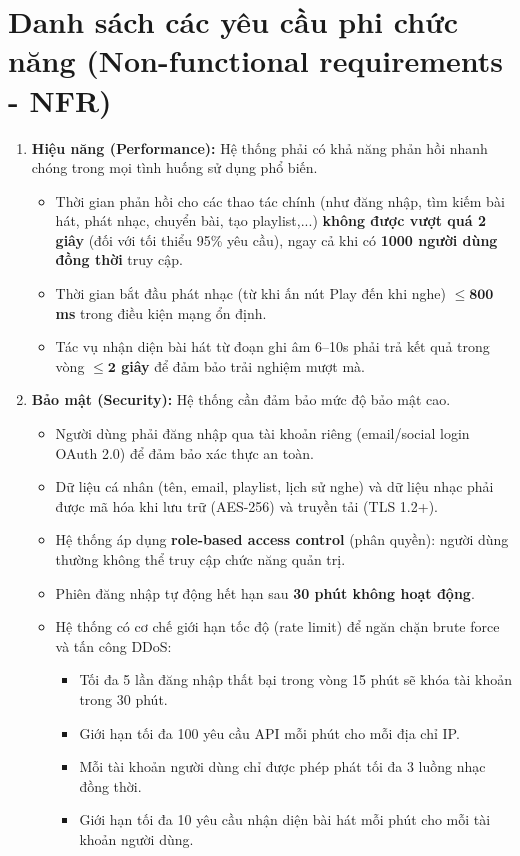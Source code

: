 \section{Danh sách các yêu cầu phi chức năng (Non-functional requirements - NFR)}
\begin{enumerate}
    \item \textbf{Hiệu năng (Performance):} Hệ thống phải có khả năng phản hồi nhanh chóng trong mọi tình huống sử dụng phổ biến.
    \begin{itemize}
        \item Thời gian phản hồi cho các thao tác chính (như đăng nhập, tìm kiếm bài hát, phát nhạc, chuyển bài, tạo playlist,...) \textbf{không được vượt quá 2 giây} (đối với tối thiểu 95\% yêu cầu), ngay cả khi có \textbf{1000 người dùng đồng thời} truy cập.
        \item Thời gian bắt đầu phát nhạc (từ khi ấn nút Play đến khi nghe) \textbf{$\leq \mathbf{800}$ ms} trong điều kiện mạng ổn định.
        \item Tác vụ nhận diện bài hát từ đoạn ghi âm 6–10s phải trả kết quả trong vòng \textbf{$\leq \mathbf{2}$ giây} để đảm bảo trải nghiệm mượt mà.
    \end{itemize}

    \item \textbf{Bảo mật (Security):} Hệ thống cần đảm bảo mức độ bảo mật cao.
    \begin{itemize}
        \item Người dùng phải đăng nhập qua tài khoản riêng (email/social login OAuth 2.0) để đảm bảo xác thực an toàn.
        \item Dữ liệu cá nhân (tên, email, playlist, lịch sử nghe) và dữ liệu nhạc phải được mã hóa khi lưu trữ (AES-256) và truyền tải (TLS 1.2+).
        \item Hệ thống áp dụng \textbf{role-based access control} (phân quyền): người dùng thường không thể truy cập chức năng quản trị.
        \item Phiên đăng nhập tự động hết hạn sau \textbf{30 phút không hoạt động}.
        \item Hệ thống có cơ chế giới hạn tốc độ (rate limit) để ngăn chặn brute force và tấn công DDoS:
        \begin{itemize}
            \item Tối đa 5 lần đăng nhập thất bại trong vòng 15 phút sẽ khóa tài khoản trong 30 phút.
            \item Giới hạn tối đa 100 yêu cầu API mỗi phút cho mỗi địa chỉ IP.
            \item Mỗi tài khoản người dùng chỉ được phép phát tối đa 3 luồng nhạc đồng thời.
            \item Giới hạn tối đa 10 yêu cầu nhận diện bài hát mỗi phút cho mỗi tài khoản người dùng.
        \end{itemize}
    \end{itemize}


\end{enumerate}
